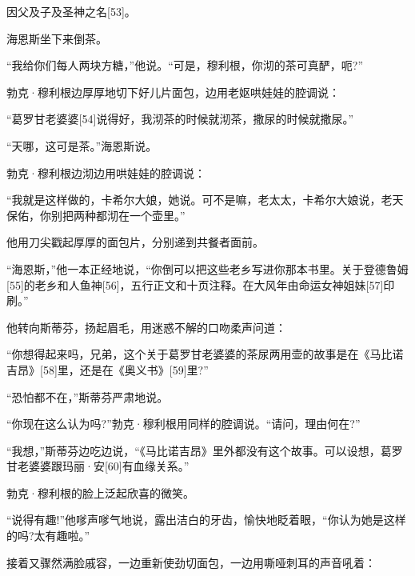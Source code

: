 \documentclass{article}
\begin{document}
因父及子及圣神之名[53]。



海恩斯坐下来倒茶。



“我给你们每人两块方糖，”他说。“可是，穆利根，你沏的茶可真酽，呃?”



勃克·穆利根边厚厚地切下好儿片面包，边用老妪哄娃娃的腔调说：



“葛罗甘老婆婆[54]说得好，我沏茶的时候就沏茶，撒尿的时候就撒尿。”



“天哪，这可是茶。”海恩斯说。



勃克·穆利根边沏边用哄娃娃的腔调说：



“我就是这样做的，卡希尔大娘，她说。可不是嘛，老太太，卡希尔大娘说，老天保佑，你别把两种都沏在一个壶里。”



他用刀尖戳起厚厚的面包片，分别递到共餐者面前。



“海恩斯，”他一本正经地说，“你倒可以把这些老乡写进你那本书里。关于登德鲁姆[55]的老乡和人鱼神[56]，五行正文和十页注释。在大风年由命运女神姐妹[57]印刷。”



他转向斯蒂芬，扬起眉毛，用迷惑不解的口吻柔声问道：



“你想得起来吗，兄弟，这个关于葛罗甘老婆婆的茶尿两用壶的故事是在《马比诺吉昂》[58]里，还是在《奥义书》[59]里?”



“恐怕都不在，”斯蒂芬严肃地说。



“你现在这么认为吗?”勃克·穆利根用同样的腔调说。“请问，理由何在?”



“我想，”斯蒂芬边吃边说，“《马比诺吉昂》里外都没有这个故事。可以设想，葛罗甘老婆婆跟玛丽·安[60]有血缘关系。”



勃克·穆利根的脸上泛起欣喜的微笑。



“说得有趣!”他嗲声嗲气地说，露出洁白的牙齿，愉快地眨着眼，“你认为她是这样的吗?太有趣啦。”



接着又骤然满脸戚容，一边重新使劲切面包，一边用嘶哑刺耳的声音吼着：
\end{document}
